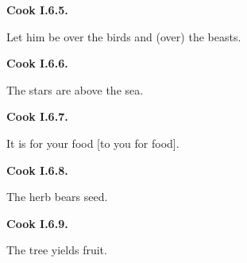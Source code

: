 \par\begin{minipage}{\linewidth}\raggedright
\textbf{Cook I.6.5.}

Let him be over the birds and (over) the beasts.

\end{minipage}\par\addvspace{4pt}

\par\begin{minipage}{\linewidth}\raggedright
\textbf{Cook I.6.6.}

The stars are above the sea.

\end{minipage}\par\addvspace{4pt}

\par\begin{minipage}{\linewidth}\raggedright
\textbf{Cook I.6.7.}

It is for your food [to you for food].

\end{minipage}\par\addvspace{4pt}

\par\begin{minipage}{\linewidth}\raggedright
\textbf{Cook I.6.8.}

The herb bears seed.

\end{minipage}\par\addvspace{4pt}

\par\begin{minipage}{\linewidth}\raggedright
\textbf{Cook I.6.9.}

The tree yields fruit.

\end{minipage}\par\addvspace{4pt}

